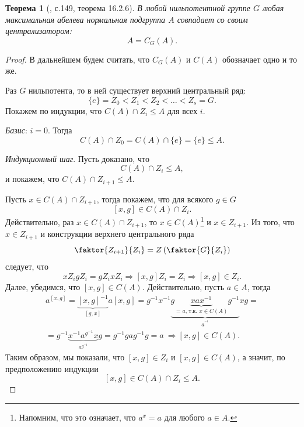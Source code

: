 \documentclass{article}
\newtheorem{theorem}{Теорема}[section]
\begin{document}
\begin{theorem}[\cite{kargapolov}, с.149, теорема 16.2.6] \label{nwqrovp}
    В любой нильпотентной группе $G$ любая максимальная абелева нормальная подгруппа $A$ совпадает со своим централизатором:
    \[
        A = C_G(A).
    \]
\end{theorem}
\begin{proof}
    В дальнейшем будем считать, что $C_G(A)$ и $C(A)$ обозначает одно и то же.
    
    Раз $G$ нильпотента, то в ней существует верхний центральный ряд:
    \[
        \{ e \} = Z_0 < Z_1 < Z_2 < \ldots < Z_s = G.
    \]
    Покажем по индукции, что $C(A) \cap Z_i \leqslant A$ для всех $i$.

    \textit{Базис}: $i = 0$. Тогда $$ C(A) \cap Z_0 = C(A) \cap \{ e \} = \{ e \} \leqslant A. $$

    \textit{Индукционный шаг}. Пусть доказано, что
    \begin{equation} \tag{*} \label{fjweio}
        C(A) \cap Z_i \leqslant A,
    \end{equation}
    и покажем, что $C(A) \cap Z_{i + 1} \leqslant A$.

    Пусть $x \in C(A) \cap Z_{i + 1}$, тогда покажем, что для всякого $g \in G$
    \[
        [x, g] \in C(A) \cap Z_i.
    \]
    Действительно, раз $x \in C(A) \cap Z_{i + 1} $, то $ x \in C(A)$\footnote{Напомним, что это означает, что $a^x = a$ для любого $a \in A$.} и $x \in Z_{i + 1}$.
    Из того, что $x \in Z_{i + 1}$ и конструкции верхнего центрального ряда $$ \faktor{Z_{i + 1}}{Z_i} = Z \left( \faktor{G}{Z_i} \right) $$ следует, что $$ x Z_i g Z_i = g Z_i x Z_i \Rightarrow [x, g] Z_i = Z_i \Rightarrow [x, g] \in Z_i. $$
    Далее, убедимся, что $[x, g] \in C(A)$. Действительно, пусть $a \in A$, тогда
    \begin{gather*}
        a^{[x, g]} = \underbrace{[x, g]^{-1}}_{[g, x]} a [x, g] = g^{-1} x^{-1} \underbrace{g \underbrace{x a x^{-1}}_{=a\text{, т.к. } x \in C(A)} g^{-1}}_{a^{^{-1}}} x g = \\
        = g^{-1} \underbrace{x^{-1} a^{g^{-1}} x}_{a^{g^{-1}}} g = g^{-1} g a g^{-1} g = a \ \Rightarrow [x, g] \in C(A).
    \end{gather*}
    Таким образом, мы показали, что $[x, g] \in Z_i$ и $[x, g] \in C(A)$, а значит, по предположению индукции $$ [x, g] \in C(A) \cap Z_i \leqslant A. $$


\end{proof}
\end{document}
